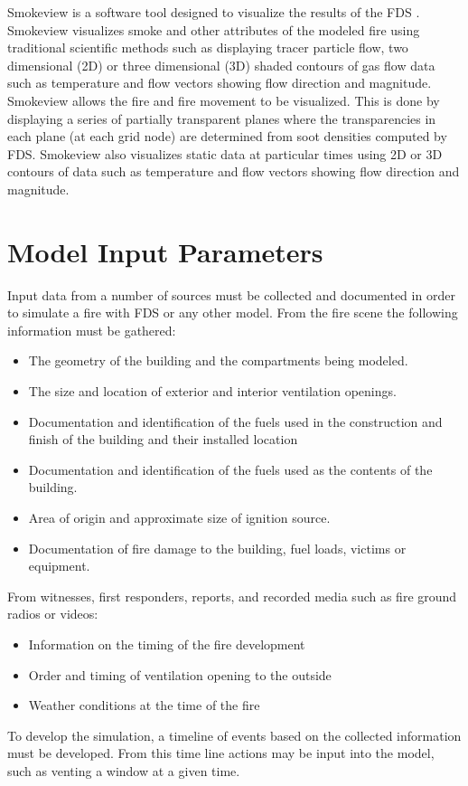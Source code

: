 \documentclass[11pt,oneside]{book}
\begin{document}
Smokeview is a software tool designed to visualize the results of the FDS \cite{Smokeview_Users_Guide}.  Smokeview visualizes smoke and other attributes of the modeled fire using traditional scientific methods such as displaying tracer particle flow, two dimensional (2D) or three dimensional (3D) shaded contours of gas flow data such as temperature and flow vectors showing flow direction and magnitude.  Smokeview allows the fire and fire movement to be visualized.  This is done by displaying a series of partially transparent planes where the transparencies in each plane (at each grid node) are determined from soot densities computed by FDS.  Smokeview also visualizes static data at particular times using 2D or 3D contours of data such as temperature and flow vectors showing flow direction and magnitude.


\chapter{Model Input Parameters}
Input data from a number of sources must be collected and documented in order to simulate a fire with FDS or any other model. 
From the fire scene the following information must be gathered:
\begin{itemize}
\item The geometry of the building and the compartments being modeled.
\item The size and location of exterior and interior ventilation openings. 
\item Documentation and identification of the fuels used in the construction and finish of the building and their installed location
\item Documentation and identification of the fuels used as the contents of the building. 
\item Area of origin and approximate size of ignition source.
\item Documentation of fire damage to the building, fuel loads, victims or equipment.
\end{itemize}
From witnesses, first responders, reports, and recorded media such as fire ground radios or videos:
\begin{itemize}
\item Information on the timing of the fire development
\item Order and timing of ventilation opening to the outside
\item Weather conditions at the time of the fire
\end{itemize}
To develop the simulation, a timeline of events based on the collected information must be developed.   From this time line actions may be input into the model, such as venting a window at a given time. 
  
\end{document}

